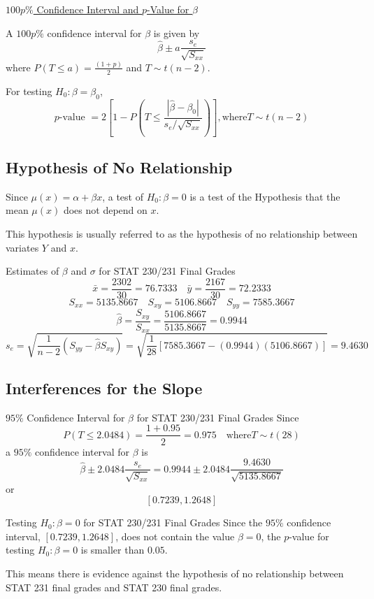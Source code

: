 \documentclass[oneside]{book}
\begin{document}
\underline{$ 100p\% $ Confidence Interval and $ p $-Value for $ \beta $}

A $ 100p\% $ confidence interval for $ \beta $ is given by
\[\hat{\beta} \pm a \frac{s_{e}}{\sqrt{S_{x x}}}\]
where $ P(T\leq a)=\frac{(1+p)}{2} $ and $ T\sim t(n-2) $.

For testing $ H_0: \beta=\beta_0 $,
\[p \text{-value }=2\left[1-P\left(T \leq \frac{\left|\hat{\beta}-\beta_{0}\right|}{s_{e} / \sqrt{S_{x x}}}\right)\right], \text{where} T \sim t(n-2)\]

\subsection{Hypothesis of No Relationship}
Since $ \mu(x)=\alpha+\beta x $, a test of $ H_0: \beta=0 $ is a test of the Hypothesis
that the mean $ \mu(x) $ does not depend on $ x $.

This hypothesis is usually referred to as the hypothesis of no relationship
between variates $ Y $ and $ x $.


\begin{Example}{Estimates of $ \beta $ and $ \sigma $ for STAT 230/231 Final Grades}{}
    \[\bar{x}=\frac{2302}{30}=76.7333 \quad \bar{y}=\frac{2167}{30}=72.2333\]
    \[S_{x x}=5135.8667 \quad S_{x y}=5106.8667 \quad S_{y y}=7585.3667\]
    \[\hat{\beta}=\frac{S_{x y}}{S_{x x}}=\frac{5106.8667}{5135.8667}=0.9944\]
    \[s_{e}=\sqrt{\frac{1}{n-2}\left(S_{y y}-\hat{\beta} S_{x y}\right)}
        =\sqrt{\frac{1}{28}[7585.3667-(0.9944)(5106.8667)]}=9.4630\]
\end{Example}


\subsection{Interferences for the Slope}

\begin{Example}{$ 95\% $ Confidence Interval for $ \beta $ for STAT 230/231 Final Grades}{}
    Since
    \[P(T \leq 2.0484)=\frac{1+0.95}{2}=0.975 \quad \text{where} T \sim t(28)\]
    a $ 95\% $ confidence interval for $ \beta $ is
    \[\hat{\beta} \pm 2.0484 \frac{s_{e}}{\sqrt{S_{x x}}}
        =0.9944 \pm 2.0484 \frac{9.4630}{\sqrt{5135.8667}}\]
    or
    \[ \left[ 0.7239,1.2648 \right] \]
\end{Example}



\begin{Example}{Testing $ H_0:\beta=0 $ for STAT 230/231 Final Grades}{}
    Since the $ 95\% $ confidence interval, $ \left[ 0.7239,1.2648 \right] $,
    does not contain the value $ \beta=0 $, the $ p $-value for testing
    $ H_0:\beta=0 $ is smaller than $ 0.05 $.

    This means there is evidence against the hypothesis of no relationship
    between STAT 231 final grades and STAT 230 final grades.
\end{Example}
\end{document}
